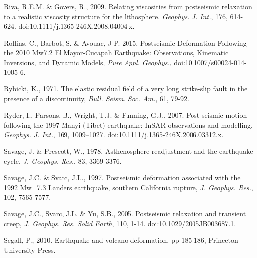 \documentclass[extra,mreferee]{gji}
\begin{document}
\begin{thebibliography}{}
 Riva, R.E.M. \&
  Govers, R., 2009. Relating viscosities from postseismic relaxation
  to a realistic viscosity structure for the
  lithosphere. \textit{Geophys. J.  Int.}, 176,
  614-624. doi:10.1111/j.1365-246X.2008.04004.x.

 Rollins, C., Barbot,
  S. \& Avouac, J-P. 2015, Postseismic Deformation Following the 2010
  Mw7.2 El Mayor-Cucapah Earthquake: Observations, Kinematic
  Inversions, and Dynamic Models, \textit{Pure Appl. Geophys.},
  doi:10.1007/s00024-014-1005-6.

 Rybicki, K., 1971. The elastic
  residual field of a very long strike-slip fault in the presence of a
  discontinuity, \textit{Bull. Seism. Soc. Am.}, 61, 79-92.

 Ryder, I., Parsons, B.,
  Wright, T.J. \& Funning, G.J., 2007.  Post-seismic motion following
  the 1997 Manyi (Tibet) earthquake: InSAR observations and
  modelling, \textit{Geophys. J. Int.}, 169,
  1009–1027. doi:10.1111/j.1365-246X.2006.03312.x.

 Savage, J. \&
  Prescott, W., 1978. Asthenosphere readjustment and the earthquake
  cycle, \textit{J. Geophys. Res.}, 83, 3369-3376.

 Savage, J.C. \& Svarc, J.L.,
  1997. Postseismic deformation associated with the 1992 Mw=7.3
  Landers earthquake, southern California rupture,
  \textit{J. Geophys. Res.}, 102, 7565-7577.

 Savage, J.C., Svarc, J.L. \& Yu,
  S.B., 2005. Postseismic relaxation and transient creep,
  \textit{J. Geophys. Res. Solid Earth}, 110,
  1-14. doi:10.1029/2005JB003687.1.

 Segall, P., 2010. Earthquake and
  volcano deformation, pp 185-186, Princeton University Press.

\end{thebibliography}
\end{document}
